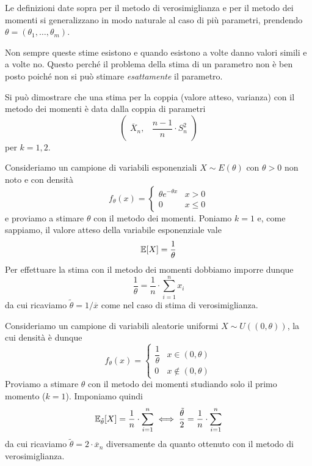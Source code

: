 Le definizioni date sopra per il metodo di verosimiglianza e per il metodo dei momenti si
generalizzano in modo naturale al caso di più parametri, prendendo
$\theta = (\theta_1, \dots, \theta_m)$.

Non sempre queste stime esistono e quando esistono a volte danno valori simili e a volte no. Questo
perché il problema della stima di un parametro non è ben posto poiché non si può stimare
\emph{esattamente} il parametro.

Si può dimostrare che una stima per la coppia (valore atteso, varianza) con il metodo dei momenti
è data dalla coppia di parametri
\[ \begin{pmatrix} \overline{X}_n, & \dfrac{n-1}{n} \cdot S_n^2 \end{pmatrix} \]
per $k = 1, 2$.

\begin{example}
	Consideriamo un campione di variabili esponenziali $X \sim E(\theta)$ con $\theta > 0$ non noto
	e con densità
	\[
		f_\theta(x) = \begin{cases}
			\theta e^{-\theta x} & x > 0    \\
			0                    & x \leq 0
		\end{cases}
	\]
	e proviamo a stimare $\theta$ con il metodo dei momenti. Poniamo $k=1$ e, come sappiamo, il
	valore atteso della variabile esponenziale vale
	\[ \mathbb{E}[X] = \frac{1}{\theta} \]
	Per effettuare la stima con il metodo dei momenti dobbiamo imporre dunque
	\[ \frac{1}{\theta} = \frac{1}{n} \cdot \sum_{i=1}^n x_i \]
	da cui ricaviamo $\tilde{\theta} = 1 / \overline{x}$ come nel caso di stima di verosimiglianza.
\end{example}

\begin{example}
	Consideriamo un campione di variabili aleatorie uniformi $X \sim U((0, \theta))$, la cui
	densità è dunque
	\[
		f_\theta(x) = \begin{cases}
			\dfrac{1}{\theta} & x \in (0, \theta)    \\[2ex]
			0                 & x \notin (0, \theta)
		\end{cases}
	\]
	Proviamo a stimare $\theta$ con il metodo dei momenti studiando solo il primo momento ($k=1$).
	Imponiamo quindi
	\[
		\mathbb{E}_{\tilde{\theta}}[X] = \frac{1}{n} \cdot \sum_{i=1}^n \iff
		\frac{\tilde{\theta}}{2} = \frac{1}{n} \cdot \sum_{i=1}^n
	\]
	da cui ricaviamo $\tilde{\theta} = 2 \cdot \overline{x}_n$ diversamente da quanto ottenuto
	con il metodo di verosimiglianza.
\end{example}
